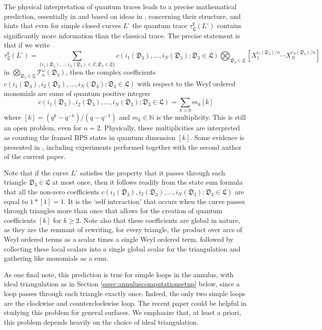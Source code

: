 \documentclass[12pt,
	]{amsart}
\theoremstyle{definition}
\newcommand{\mbb}[1]{\mathbb{#1}}
\newcommand{\mcal}[1]{\mathcal{#1}}
\newcommand{\mfrak}[1]{\mathfrak{#1}}
\newcommand{\unbased}[1]{#1^\circ}
\newcommand{\inv}[1]{#1^{-1}}
\newcommand{\Z}{\mbb{Z}}
\newcommand{\nnegZ}{\mbb{N}}
\newcommand{\ttriang}{\mfrak{D}_3}
\newcommand{\idealtriang}{\mfrak{L}}
\newcommand{\wroot}{\omega}
\newcommand{\qtorus}[1]{\mcal{T}_n^\wroot(#1)}
\newcommand{\qtr}{\tau^q_\idealtriang}
\begin{document}
The physical interpretation of quantum traces leads to a precise mathematical prediction, essentially in \cite{gabellaMR3613514, neitzkeMR4190271, neitzkeMR4482975} and based on ideas in \cite{gaiottoMR3250763}, concerning their structure, and hints that even for simple closed curves $\unbased{L}$ the quantum trace $\qtr(\unbased{L})$ contains significantly more information than the classical trace.  The precise statement is that if we write
\begin{equation*}
\qtr(\unbased{L})=\sum_{\{i_1(\ttriang),\dots,i_N(\ttriang)\in\Z;\ttriang\in\idealtriang\}}
c(i_1(\ttriang),\dots,i_N(\ttriang);\ttriang\in\idealtriang)
\bigotimes_{\ttriang\in\idealtriang}\left[X_1^{i_1(\ttriang)/n}\cdots X_N^{i_N(\ttriang)/n}\right]
\end{equation*}
in $\bigotimes_{\ttriang\in\idealtriang}\qtorus{\ttriang}$, then the complex coefficients $c(i_1(\ttriang),i_2(\ttriang),\dots,i_N(\ttriang);\ttriang\in\idealtriang)$ with respect to the Weyl ordered monomials are sums of quantum positive integers
\begin{equation*}
c(i_1(\ttriang),i_2(\ttriang),\dots,i_N(\ttriang);\ttriang\in\idealtriang)
=\sum_{k>0} m_k[k]
\end{equation*}
where $[k]=(q^k-q^{-k})/(q-\inv{q})$ and $m_k\in\nnegZ$ is the multiplicity.  This is still an open problem, even for $n=2$.  Physically, these multiplicities are interpreted as counting the framed BPS states in quantum dimension $[k]$.  Some evidence is presented in \cite{neitzkeMR4482975}, including experiments performed together with the second author of the current paper.  

Note that if the curve $\unbased{L}$ satisfies the property that it passes through each triangle $\ttriang\in\idealtriang$ at most once, then it follows readily from the state sum formula that all the non-zero coefficients $c(i_1(\ttriang),i_2(\ttriang),\dots,i_N(\ttriang);\ttriang\in\idealtriang)$ are equal to $1*[1]=1$.  It is the `self interaction' that occurs when the curve passes through triangles more than once that allows for the creation of quantum coefficients $[k]$ for $k\geq2$.  Note also that these coefficients are global in nature, as they are the remnant of rewriting, for every triangle, the product over arcs of Weyl ordered terms as a scalar times a single Weyl ordered term, followed by collecting these local scalars into a single global scalar for the triangulation and gathering like monomials as a sum.  

As one final note, this prediction is true for simple loops in the annulus, with ideal triangulation as in Section \ref{sssec:annuluscomputationsetup} below, since a loop passes through each triangle exactly once.  Indeed, the only two simple loops are the clockwise and counterclockwise loop.  The recent paper \cite{kim2024quantized} could be helpful in studying this problem for general surfaces.  We emphasize that, at least a priori, this problem depends heavily on the choice of ideal triangulation.  
\end{document}
